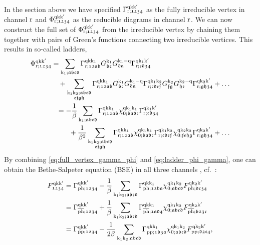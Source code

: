 \documentclass[../../main.tex]{subfiles}
\begin{document}
In the section above we have specified $\Gamma_{\text{r};\mathfrak{1234}}^{\text{q}\text{k}\text{k}'}$ as the fully irreducible vertex in channel $\text{r}$ and $\Phi_{\text{r};\mathfrak{1234}}^{\text{q}\text{k}\text{k}'}$	as the reducible diagrams in channel $\text{r}$. We can now construct the full set of $\Phi_{\text{r};\mathfrak{1234}}^{\text{q}\text{k}\text{k}'}$ from the irreducible vertex by chaining them together with pairs of Green's functions connecting two irreducible vertices. This results in so-called ladders, 
\begin{subequations}\label{eq:ladder_phi_gamma}
\begin{align}
\begin{split}
	\Phi_{\text{r};\mathfrak{1234}}^{\text{q}\text{k}\text{k}'}&=\sum_{\text{k}_1;\mathfrak{abcd}} \Gamma_{\text{r};\mathfrak{12ab}}^{\text{q}\text{k}\text{k}_1} G_{\mathfrak{bc}}^{\text{k}_1} G_{\mathfrak{da}}^{\text{k}_1-\text{q}} \Gamma_{\text{r};\mathfrak{cd34}}^{\text{q}\text{k}_1\text{k}'}\\
	&\quad+\sum_{\substack{\text{k}_1\text{k}_2;\mathfrak{abcd}\\\mathfrak{efgh}}} \Gamma_{\text{r};\mathfrak{12ab}}^{\text{q}\text{k}\text{k}_1} G_{\mathfrak{bc}}^{\text{k}_1} G_{\mathfrak{da}}^{\text{k}_1-\text{q}} \Gamma_{\text{r};\mathfrak{cdef}}^{\text{q}\text{k}_1\text{k}_2} G_{\mathfrak{fg}}^{\text{k}_2} G_{\mathfrak{he}}^{\text{k}_2-\text{q}} \Gamma_{\text{r};\mathfrak{gh34}}^{\text{q}\text{k}_2\text{k}'} + \dots
\end{split}\\
\begin{split}
	&=-\frac1\beta\sum_{\text{k}_1;\mathfrak{abcd}} \Gamma_{\text{r};\mathfrak{12ab}}^{\text{q}\text{k}\text{k}_1} \chi^{\text{q}\text{k}_1\text{k}_1}_{0;\mathfrak{badc}} \Gamma_{\text{r};\mathfrak{cd34}}^{\text{q}\text{k}_1\text{k}'}\\
	&\phantom{-}\quad+\frac{1}{\beta^2}\sum_{\substack{\text{k}_1\text{k}_2;\mathfrak{abcd}\\\mathfrak{efgh}}} \Gamma_{\text{r};\mathfrak{12ab}}^{\text{q}\text{k}\text{k}_1} \chi^{\text{q}\text{k}_1\text{k}_1}_{0;\mathfrak{badc}} \Gamma_{\text{r};\mathfrak{cdef}}^{\text{q}\text{k}_1\text{k}_2} \chi^{\text{q}\text{k}_2\text{k}_2}_{0;\mathfrak{fehg}} \Gamma_{\text{r};\mathfrak{gh34}}^{\text{q}\text{k}_2\text{k}'} + \dots
\end{split}
\end{align}
\end{subequations}
By combining \eqref{eq:full_vertex_gamma_phi} and \eqref{eq:ladder_phi_gamma}, one can obtain the Bethe-Salpeter equation (BSE) in all three channels \cite{Salpeter1951, Nambu1950, Rohringer2013}, cf.\ :
\begin{subequations}\label{eq:bethe_salpeter_vertex_three_channels}
\begin{align}
	F_{\mathfrak{1234}}^{\text{q}\text{k}\text{k}'}&=\Gamma_{\text{ph};\mathfrak{1234}}^{\text{q}\text{k}\text{k}'}-\frac1\beta\sum_{\text{k}_1\text{k}_2;\mathfrak{abcd}} \Gamma_{\text{ph};\mathfrak{12ba}}^{\text{q}\text{k}\text{k}_1} \chi_{0;\mathfrak{abcd}}^{\text{q}\text{k}_1\text{k}_2} F_{\text{ph};\mathfrak{dc34}}^{\text{q}\text{k}_2\text{k}'}\\
	&=\Gamma_{\overline{\text{ph}};\mathfrak{1234}}^{\text{q}\text{k}\text{k}'}+\frac1\beta\sum_{\text{k}_1\text{k}_2;\mathfrak{abcd}} \Gamma_{\overline{\text{ph}};\mathfrak{1ad4}}^{\text{q}\text{k}\text{k}_1} \chi_{0;\mathfrak{abcd}}^{\text{q}\text{k}_1\text{k}_2} F_{\overline{\text{ph}};\mathfrak{b23c}}^{\text{q}\text{k}_2\text{k}'}\\
	&=\Gamma_{\text{pp};\mathfrak{1234}}^{\text{q}\text{k}\text{k}'}-\frac{1}{2\beta}\sum_{\text{k}_1\text{k}_2;\mathfrak{abcd}} \Gamma_{\text{pp};\mathfrak{1b3a}}^{\text{q}\text{k}\text{k}_1} \chi_{0;\mathfrak{abcd}}^{\text{q}\text{k}_1\text{k}_2} F_{\text{pp};\mathfrak{d2c4}}^{\text{q}\text{k}_2\text{k}'},
\end{align}
\end{subequations}
\end{document}
